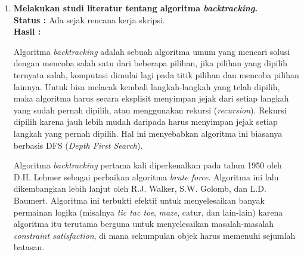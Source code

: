 \documentclass[a4paper,twoside]{article}
\begin{document}
\begin{enumerate}
		\item \textbf{Melakukan studi literatur tentang algoritma \textit{backtracking}.}\\
		{\bf Status :} Ada sejak rencana kerja skripsi.\\
		{\bf Hasil :}
		
		Algoritma \textit{backtracking} adalah sebuah algoritma umum yang mencari solusi dengan mencoba salah satu dari beberapa pilihan, jika pilihan yang dipilih ternyata salah, komputasi dimulai lagi pada titik pilihan dan mencoba pilihan lainnya. Untuk bisa melacak kembali langkah-langkah yang telah dipilih, maka algoritma harus secara eksplisit menyimpan jejak dari setiap langkah yang sudah pernah dipilih, atau menggunakan rekursi (\textit{recursion}). Rekursi dipilih karena jauh lebih mudah daripada harus menyimpan jejak setiap langkah yang pernah dipilih. Hal ini menyebabkan algoritma ini biasanya berbasis DFS (\textit{Depth First Search}).

Algoritma \textit{backtracking} pertama kali diperkenalkan pada tahun 1950 oleh D.H. Lehmer sebagai perbaikan algoritma \textit{brute force}. Algoritma ini lalu dikembangkan lebih lanjut oleh R.J. Walker, S.W. Golomb, dan L.D. Baumert. Algoritma ini terbukti efektif untuk menyelesaikan banyak permainan logika (misalnya \textit{tic tac toe}, \textit{maze}, catur, dan lain-lain) karena algoritma itu terutama berguna untuk menyelesaikan masalah-masalah \textit{constraint satisfaction}, di mana sekumpulan objek harus memenuhi sejumlah batasan.


\end{enumerate}
\end{document}
